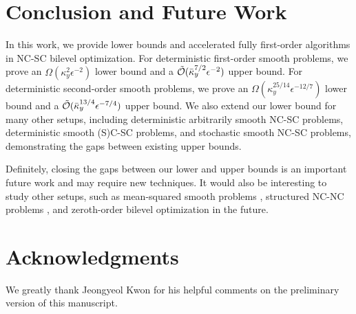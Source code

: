 \documentclass{article}
\begin{document}
\section{Conclusion and Future Work}

In this work, we provide lower bounds and accelerated fully first-order algorithms in NC-SC bilevel optimization. For deterministic first-order smooth problems, we prove an $\Omega(\kappa_y^2 \epsilon^{-2})$ lower bound and a $\tilde {{\mathcal{O}}}(\bar \kappa_y^{7/2} \epsilon^{-2})$ upper bound. For deterministic second-order smooth problems, we prove an $\Omega(\kappa_y^{25/14} \epsilon^{-12/7})$ lower bound and a $\tilde {{\mathcal{O}}}(\bar \kappa_y^{13/4} \epsilon^{-7/4})$ upper bound. We also extend our lower bound for many other setups, including deterministic arbitrarily smooth NC-SC problems, deterministic smooth (S)C-SC problems, and stochastic smooth NC-SC problems, demonstrating the gaps between existing upper bounds. 

Definitely, closing the gaps between our lower and upper bounds is an important future work and may require new techniques. It would also be interesting to study other setups, such as 
mean-squared smooth problems \citep{khanduri2021near,yang2021provably, dagreou2022framework,yang2023achieving,chu2024spaba}, 
structured NC-NC problems \citep{kwon2024penalty,chen2024finding,jiang2025beyond}, and  zeroth-order bilevel optimization \citep{aghasi2025fully,aghasi2025optimal} in the future.



\section*{Acknowledgments}

We greatly thank Jeongyeol Kwon for his helpful comments on the preliminary version of this manuscript.





\appendix

\end{document}
